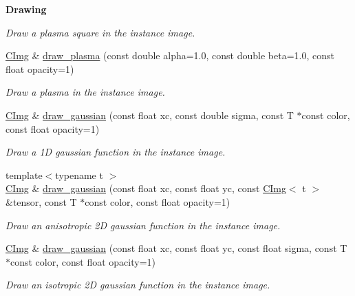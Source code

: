 \begin{Indent}{\bf Drawing}
\begin{DoxyCompactItemize}
\begin{DoxyCompactList}\small\item\em Draw a plasma square in the instance image. \item\end{DoxyCompactList}\item 
\hyperlink{structcimg__library_1_1_c_img}{CImg} \& \hyperlink{structcimg__library_1_1_c_img_af21f76918c19d35a25ca5b0c27b3d106}{draw\_\-plasma} (const double alpha=1.0, const double beta=1.0, const float opacity=1)
\begin{DoxyCompactList}\small\item\em Draw a plasma in the instance image. \item\end{DoxyCompactList}\item 
\hyperlink{structcimg__library_1_1_c_img}{CImg} \& \hyperlink{structcimg__library_1_1_c_img_ae8023a6e536e22fc1d2960b7067bba57}{draw\_\-gaussian} (const float xc, const double sigma, const T $\ast$const color, const float opacity=1)
\begin{DoxyCompactList}\small\item\em Draw a 1D gaussian function in the instance image. \item\end{DoxyCompactList}\item 
{\footnotesize template$<$typename t $>$ }\\\hyperlink{structcimg__library_1_1_c_img}{CImg} \& \hyperlink{structcimg__library_1_1_c_img_a7d80c0c5b1d47a9db12e21c559815344}{draw\_\-gaussian} (const float xc, const float yc, const \hyperlink{structcimg__library_1_1_c_img}{CImg}$<$ t $>$ \&tensor, const T $\ast$const color, const float opacity=1)
\begin{DoxyCompactList}\small\item\em Draw an anisotropic 2D gaussian function in the instance image. \item\end{DoxyCompactList}\item 
\hyperlink{structcimg__library_1_1_c_img}{CImg} \& \hyperlink{structcimg__library_1_1_c_img_aa8ac26c025f384a91bc8c44d4ba69e54}{draw\_\-gaussian} (const float xc, const float yc, const float sigma, const T $\ast$const color, const float opacity=1)
\begin{DoxyCompactList}\small\item\em Draw an isotropic 2D gaussian function in the instance image. \item\end{DoxyCompactList}\item 

\end{DoxyCompactItemize}
\end{Indent}
